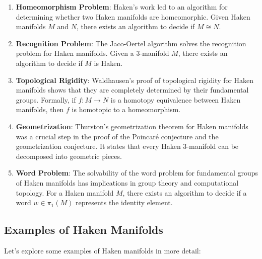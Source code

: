 \documentclass{article}
\begin{document}
\begin{enumerate}
  \item \textbf{Homeomorphism Problem}: Haken's work led to an algorithm for determining whether two Haken manifolds are homeomorphic. Given Haken manifolds $M$ and $N$, there exists an algorithm to decide if $M \cong N$.
  
  \item \textbf{Recognition Problem}: The Jaco-Oertel algorithm solves the recognition problem for Haken manifolds. Given a 3-manifold $M$, there exists an algorithm to decide if $M$ is Haken.
  
  \item \textbf{Topological Rigidity}: Waldhausen's proof of topological rigidity for Haken manifolds shows that they are completely determined by their fundamental groups. Formally, if $f : M \to N$ is a homotopy equivalence between Haken manifolds, then $f$ is homotopic to a homeomorphism.
  
  \item \textbf{Geometrization}: Thurston's geometrization theorem for Haken manifolds was a crucial step in the proof of the Poincaré conjecture and the geometrization conjecture. It states that every Haken 3-manifold can be decomposed into geometric pieces.
  
  \item \textbf{Word Problem}: The solvability of the word problem for fundamental groups of Haken manifolds has implications in group theory and computational topology. For a Haken manifold $M$, there exists an algorithm to decide if a word $w \in \pi_1(M)$ represents the identity element.
\end{enumerate}

\subsection{Examples of Haken Manifolds}

Let's explore some examples of Haken manifolds in more detail:
\end{document}
